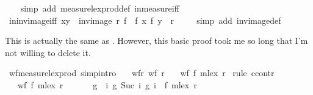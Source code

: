 \begin{isabellebody}
%
\isadelimproof
\ \ %
\endisadelimproof
%
\isatagproof
{}\isamarkupfalse%
\ {\isacharparenleft}simp\ add{\isacharcolon}\ measure{\isacharunderscore}lex{\isacharunderscore}prod{\isacharunderscore}def{\isacharprime}\ in{\isacharunderscore}measure{\isacharunderscore}iff{\isacharparenright}%
\endisatagproof
{\isafoldproof}%
%
\isadelimproof
\isanewline
%
\endisadelimproof
\isanewline
{}\isamarkupfalse%
\ in{\isacharunderscore}inv{\isacharunderscore}image{\isacharunderscore}iff{\isacharcolon}\ {\isachardoublequoteopen}{\isacharparenleft}x{\isacharcomma}y{\isacharparenright}\ {\isasymin}\ inv{\isacharunderscore}image\ r\ f\ {\isacharequal}\ {\isacharparenleft}{\isacharparenleft}f\ x{\isacharcomma}\ f\ y{\isacharparenright}\ {\isasymin}\ r{\isacharparenright}{\isachardoublequoteclose}\ \isanewline
%
\isadelimproof
\ \ %
\endisadelimproof
%
\isatagproof
{}\isamarkupfalse%
\ {\isacharparenleft}simp\ add{\isacharcolon}\ inv{\isacharunderscore}image{\isacharunderscore}def{\isacharparenright}%
\endisatagproof
{\isafoldproof}%
%
\isadelimproof
%
\endisadelimproof
%
\begin{isamarkuptext}%
This is actually the same as . However, this basic
proof took me so long that I'm not willing to delete it.%
\end{isamarkuptext}\isamarkuptrue%
\isamarkupfalse%
\ wf{\isacharunderscore}measure{\isacharunderscore}lex{\isacharunderscore}prod\ {\isacharbrackleft}simp{\isacharcomma}intro{\isacharbrackright}{\isacharcolon}\isanewline
\ \ \ wf{\isacharunderscore}r{\isacharcolon}\ {\isachardoublequoteopen}wf\ r{\isachardoublequoteclose}\isanewline
\ \ \ {\isachardoublequoteopen}wf\ {\isacharparenleft}f\ {\isacharless}{\isacharasterisk}mlex{\isacharasterisk}{\isachargreater}\ r{\isacharparenright}{\isachardoublequoteclose}\isanewline
%
\isadelimproof
%
\endisadelimproof
%
\isatagproof
{}\isamarkupfalse%
\ {\isacharparenleft}rule\ ccontr{\isacharparenright}\isanewline
\ \ \isamarkupfalse%
\ {\isachardoublequoteopen}\ {\isasymnot}\ wf\ {\isacharparenleft}f\ {\isacharless}{\isacharasterisk}mlex{\isacharasterisk}{\isachargreater}\ r{\isacharparenright}{\isachardoublequoteclose}\isanewline
\ \ \isamarkupfalse%
\isanewline
\ \ \isamarkupfalse%
\ g\ \ {\isachardoublequoteopen}{\isasymforall}i{\isachardot}\ {\isacharparenleft}g\ {\isacharparenleft}Suc\ i{\isacharparenright}{\isacharcomma}\ g\ i{\isacharparenright}\ {\isasymin}\ f\ {\isacharless}{\isacharasterisk}mlex{\isacharasterisk}{\isachargreater}\ r{\isachardoublequoteclose}\isanewline

\end{isabellebody}
